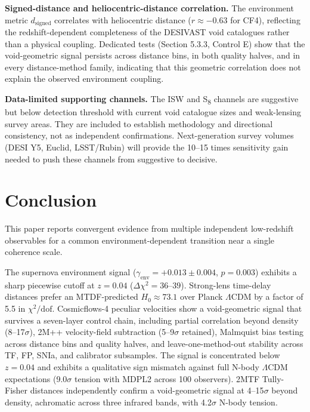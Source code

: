 \documentclass[11pt,a4paper]{article}
\begin{document}
\textbf{Signed-distance and heliocentric-distance correlation.} The environment metric \(d_\mathrm{signed}\) correlates with heliocentric distance (\(r \approx -0.63\) for CF4), reflecting the redshift-dependent completeness of the DESIVAST void catalogues rather than a physical coupling. Dedicated tests (Section 5.3.3, Control E) show that the void-geometric signal persists across distance bins, in both quality halves, and in every distance-method family, indicating that this geometric correlation does not explain the observed environment coupling.

\textbf{Data-limited supporting channels.} The ISW and S\textsubscript{8} channels are suggestive but below detection threshold with current void catalogue sizes and weak-lensing survey areas. They are included to establish methodology and directional consistency, not as independent confirmations. Next-generation survey volumes (DESI Y5, Euclid, LSST/\allowbreak{}Rubin) will provide the 10--15 times sensitivity gain needed to push these channels from suggestive to decisive.

\section{Conclusion}
\label{sec:sec10}
This paper reports convergent evidence from multiple independent low-redshift observables for a common environment-dependent transition near a single coherence scale.

The supernova environment signal (\(\gamma_\mathrm{env} = +0.013 \pm 0.004\), \(p = 0.003\)) exhibits a sharp piecewise cutoff at \(z = 0.04\) (\(\Delta\chi^2 = 36\text{--}39\)). Strong-lens time-delay distances prefer an MTDF-predicted \(H_0 \approx 73.1\) over Planck \(\Lambda\)CDM by a factor of 5.5 in \(\chi^2/\mathrm{dof}\). Cosmicflows-4 peculiar velocities show a void-geometric signal that survives a seven-layer control chain, including partial correlation beyond density (8--17\(\sigma\)), 2M++ velocity-field subtraction (5--9\(\sigma\) retained), Malmquist bias testing across distance bins and quality halves, and leave-one-method-out stability across TF, FP, SNIa, and calibrator subsamples. The signal is concentrated below \(z = 0.04\) and exhibits a qualitative sign mismatch against full N-body \(\Lambda\)CDM expectations (9.0\(\sigma\) tension with MDPL2 across 100 observers). 2MTF Tully-Fisher distances independently confirm a void-geometric signal at 4--15\(\sigma\) beyond density, achromatic across three infrared bands, with 4.2\(\sigma\) N-body tension.
\end{document}
